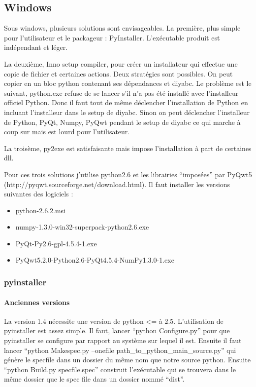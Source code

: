 \documentclass[12pt,a4paper]{article}
\begin{document}
    \subsection{Windows}
        Sous windows, plusieurs solutions sont envisageables. La première, plus simple pour l'utilisateur et le
        packageur : PyInstaller. L'ex\'ecutable produit est ind\'ependant et l\'eger. \newline

        La deuxième, Inno setup compiler, pour cr\'eer un installateur qui effectue une copie de fichier et certaines actions.
        Deux strat\'egies sont possibles. On peut copier en un bloc
        python contenant ses d\'ependances et diyabc. Le problème est le suivant, python.exe refuse de se lancer s'il n'a pas \'et\'e
        install\'e avec l'installeur officiel Python. Donc il faut tout de même d\'eclencher l'installation de Python en incluant
        l'installeur dans le setup de diyabc. Sinon on peut d\'eclencher l'installeur de Python, PyQt, Numpy, PyQwt pendant le setup de
        diyabc ce qui marche à coup sur mais est lourd pour l'utilisateur.\newline
        
        La troisème, py2exe est satisfaisante mais impose l'installation à part de certaines dll.\newline

        Pour ces trois solutions j'utilise python2.6 et les librairies ``impos\'ees'' par PyQwt5 (http://pyqwt.sourceforge.net/download.html).
        Il faut installer les versions suivantes des logiciels :
        \begin{itemize}
            \item python-2.6.2.msi
            \item numpy-1.3.0-win32-superpack-python2.6.exe
            \item PyQt-Py2.6-gpl-4.5.4-1.exe
            \item PyQwt5.2.0-Python2.6-PyQt4.5.4-NumPy1.3.0-1.exe
        \end{itemize}
        \subsubsection{pyinstaller}
        \paragraph{Anciennes versions}
        La version 1.4 nécessite une version de python <= à 2.5. L'utilisation de pyinstaller est assez simple. Il faut, 
        lancer ``python Configure.py'' pour que pyinstaller se configure par rapport au système sur lequel il est. Ensuite il faut
        lancer ``python Makespec.py --onefile path\_to\_python\_main\_source.py'' qui génère le specfile dans un dossier du même nom que
        notre source python. Ensuite ``python Build.py specfile.spec'' construit l'exécutable qui se trouvera dans le même dossier que le spec file
        dans un dossier nommé ``dist''.
\end{document}
